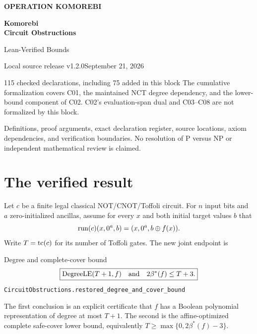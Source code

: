 \documentclass[11pt,letterpaper]{article}
\newcommand{\pathref}[1]{{\small\nolinkurl{#1}}}
\begin{document}
\begin{titlepage}\thispagestyle{empty}
{\small\sffamily\bfseries\color{accent}OPERATION KOMOREBI}\par
\vspace{.92in}
{\fontsize{32}{36}\selectfont\sffamily\bfseries\color{ink}Komorebi\\[3pt]Circuit Obstructions}\par
\vspace{.32in}
{\fontsize{23}{28}\selectfont\sffamily Lean-Verified Bounds}\par
{}\par
\vspace{.5in}{\color{accent}\rule{.67\linewidth}{1.3pt}}\par
\vspace{.24in}{\large Komorebi P.}\par
{\small\sffamily Local source release v1.2.0\quad\textbullet\quad September 21, 2026}\par
\vfill
\begin{statusbox}{115 checked declarations, including 75 added in this block}
The cumulative formalization covers C01, the maintained NCT degree dependency, and the lower-bound component of C02. C02's evaluation-span dual and C03--C08 are not formalized by this block.
\end{statusbox}
{\small Definitions, proof arguments, exact declaration register, source locations, axiom dependencies, and verification boundaries. No resolution of P versus NP or independent mathematical review is claimed.}
\end{titlepage}
\setcounter{page}{2}
\section*{The verified result}
Let $c$ be a finite legal classical NOT/CNOT/Toffoli circuit. For $n$ input bits and $a$ zero-initialized ancillas, assume for every $x$ and both initial target values $b$ that
\[
\operatorname{run}(c)(x,0^a,b)=(x,0^a,b\oplus f(x)).
\]
Write $T=\operatorname{tc}(c)$ for its number of Toffoli gates. The new joint endpoint is
\begin{statusbox}{Degree and complete-cover bound}
\[
\boxed{\operatorname{DegreeLE}(T+1,f)\quad\text{and}\quad 2\beta^*(f)\le T+3.}
\]
\pathref{CircuitObstructions.restored_degree_and_cover_bound}
\end{statusbox}
The first conclusion is an explicit certificate that $f$ has a Boolean polynomial representation of degree at most $T+1$. The second is the affine-optimized complete safe-cover lower bound, equivalently $T\ge\max\{0,2\beta^*(f)-3\}$.
\end{document}
